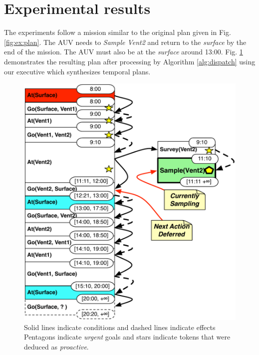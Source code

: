 \section{Experimental results}
\label{sec:exp}

The experiments follow a mission similar to the original plan given in
Fig. \ref{fig:ex:plan}. The AUV needs to {\em Sample Vent2} and return
to the {\em surface} by the end of the mission. The AUV must also be
at the {\em surface} around
13:00. %
Fig. \ref{fig:ex:mixed1} demonstrates the resulting plan after
processing by Algorithm \ref{alg:dispatch} using our executive \rx
which synthesizes temporal plans.

\begin{figure}[!htbp]
  \centering
  \includegraphics[width=0.9\columnwidth]{figs/example_MixedInitial}
  \caption{\small Solid
    lines indicate conditions and dashed lines indicate
    effects Pentagons indicate {\em urgent} goals and stars indicate
    tokens that were deduced as {\em proactive}.}
  \label{fig:ex:mixed1}
  \vskip-4mm
\end{figure}



